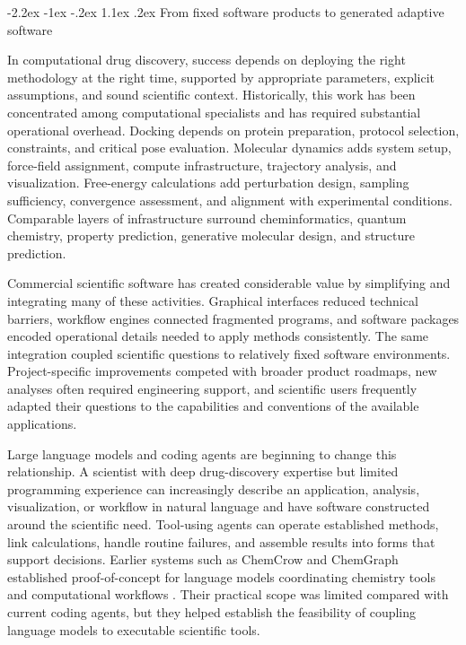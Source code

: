 \documentclass[11pt]{article}
\makeatletter
\renewcommand\section{\@startsection{section}{1}{\z@}%
  {-2.2ex \@plus -1ex \@minus -.2ex}%
  {1.1ex \@plus .2ex}%
  {\normalfont\Large\bfseries\color{molblue}}}
\makeatother
\begin{document}
\section{From fixed software products to generated adaptive software}

In computational drug discovery, success depends on deploying the right methodology at the right time, supported by appropriate parameters, explicit assumptions, and sound scientific context. Historically, this work has been concentrated among computational specialists and has required substantial operational overhead. Docking depends on protein preparation, protocol selection, constraints, and critical pose evaluation. Molecular dynamics adds system setup, force-field assignment, compute infrastructure, trajectory analysis, and visualization. Free-energy calculations add perturbation design, sampling sufficiency, convergence assessment, and alignment with experimental conditions. Comparable layers of infrastructure surround cheminformatics, quantum chemistry, property prediction, generative molecular design, and structure prediction.

Commercial scientific software has created considerable value by simplifying and integrating many of these activities. Graphical interfaces reduced technical barriers, workflow engines connected fragmented programs, and software packages encoded operational details needed to apply methods consistently. The same integration coupled scientific questions to relatively fixed software environments. Project-specific improvements competed with broader product roadmaps, new analyses often required engineering support, and scientific users frequently adapted their questions to the capabilities and conventions of the available applications.

Large language models and coding agents are beginning to change this relationship. A scientist with deep drug-discovery expertise but limited programming experience can increasingly describe an application, analysis, visualization, or workflow in natural language and have software constructed around the scientific need. Tool-using agents can operate established methods, link calculations, handle routine failures, and assemble results into forms that support decisions. Earlier systems such as ChemCrow and ChemGraph established proof-of-concept for language models coordinating chemistry tools and computational workflows \citep{bran2024chemcrow,boiko2023coscientist,pham2026chemgraph,macknight2025rethinking}. Their practical scope was limited compared with current coding agents, but they helped establish the feasibility of coupling language models to executable scientific tools.
\end{document}
